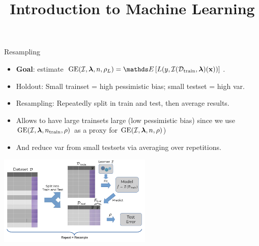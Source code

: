 \documentclass[11pt,compress,t,notes=noshow, xcolor=table]{beamer}
\title{Introduction to Machine Learning}
\begin{document}


\begin{vbframe}{Resampling}

\begin{footnotesize}
\begin{itemize}
  \item \textbf{Goal}: estimate $\GE(\ind, \lamv, n, \rho_L) = \E 
  \left[L(y, \Itrainlam(\xv)) \right]$.
  \item Holdout: 
      Small trainset = high pessimistic bias; small testset = high var.
   \item Resampling: Repeatedly split in train and test, then average results.
  \item Allows to have large trainsets large (low pessimistic bias) since we use 
  $\GEfull$ as a proxy for $\GEfull[n]$)
\item And reduce var from small testsets via averaging over repetitions.
\end{itemize}
\end{footnotesize}

\begin{center}
\includegraphics[width=0.55\textwidth]{figure_man/resampling_error.pdf}
\end{center}

\end{vbframe}
\end{document}
